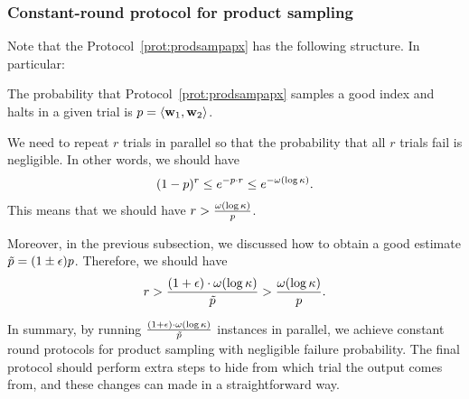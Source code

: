 \subsubsection{Constant-round protocol for product sampling}
\label{sec:const}
Note that the Protocol~\ref{prot:prodsampapx} has the following 
structure.  In particular:

\BI
\item The probability that Protocol~\ref{prot:prodsampapx} samples a
good index and halts in a given trial is $p = \langle \mathbf{w}_1, \mathbf{w}_2 \rangle$.
\EI

We need to repeat $r$ trials in parallel so that the probability that
all $r$ trials fail is negligible. In other words, we should have 
%
$$(1 - p)^{r} \le e^{-p \cdot r} \le e^{-\omega(\log \kappa)}.$$ 
%
This means that we should have
$r > \frac {\omega(\log \kappa)}{p}$. 

Moreover, in the previous subsection, we discussed how to obtain a good estimate
$\tilde p = (1 \pm \epsilon) p$. 
Therefore, we should have 
$$r > \frac {(1+\epsilon) \cdot \omega(\log \kappa) }{\tilde p}> \frac
{\omega(\log \kappa)} p .$$

In summary, by running $\frac {(1+\epsilon) \cdot \omega(\log \kappa)
}{\tilde p}$ instances in parallel, we achieve constant round protocols
for product sampling  with negligible failure probability. The final
protocol should perform extra steps to hide from which trial the output
comes from, and these changes can made in a straightforward way.



